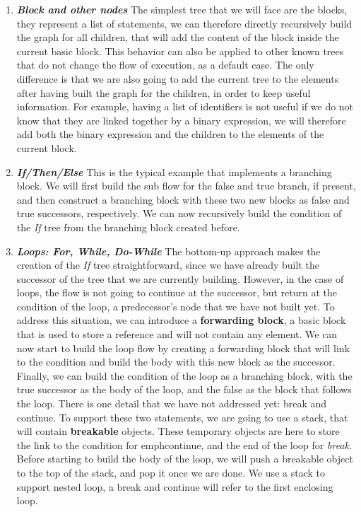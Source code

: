 \begin{enumerate}
	\item \textbf{\textit{Block and other nodes}} \newline 
	\label{subsubsec:block_and_others}
	The simplest tree that we will face are the blocks, they represent a list of statements, we can therefore directly recursively build the graph for all children, that will add the content of the block inside the current basic block. 
	This behavior can also be applied to other known trees that do not change the flow of execution, as a default case.
	The only difference is that we are also going to add the current tree to the elements after having built the graph for the children, in order to keep useful information. 
	For example, having a list of identifiers is not useful if we do not know that they are linked together by a binary expression, we will therefore add both the binary expression and the children to the elements of the current block.
	
	\item \textbf{\textit{If/Then/Else}} \newline 
	\label{subsubsec:if_then_else}
	This is the typical example that implements a branching block. 
	We will first build the sub flow for the false and true branch, if present, and then construct a branching block with these two new blocks as false and true successors, respectively.
	We can now recursively build the condition of the \emph{If} tree from the branching block created before.
	
	\item \textbf{\textit{Loops: For, While, Do-While}} \newline 
	\label{subsubsec:loops_cfg}
	The bottom-up approach makes the creation of the \emph{If} tree straightforward, since we have already built the successor of the tree that we are currently building. 
	However, in the case of loops, the flow is not going to continue at the successor, but return at the condition of the loop, a predecessor’s node that we have not built yet. 
	To address this situation, we can introduce a \textbf{forwarding block}, a basic block that is used to store a reference and will not contain any element.
	We can now start to build the loop flow by creating a forwarding block that will link to the condition and build the body with this new block as the successor. 
	Finally, we can build the condition of the loop as a branching block, with the true successor as the body of the loop, and the false as the block that follows the loop.
	There is one detail that we have not addressed yet: break and continue.
	To support these two statements, we are going to use a stack, that will contain \textbf{breakable} objects. 
	These temporary objects are here to store the link to the condition for emph{continue}, and the end of the loop for \emph{break}.
	Before starting to build the body of the loop, we will push a breakable object to the top of the stack, and pop it once we are done. 
	We use a stack to support nested loop, a break and continue will refer to the first enclosing loop.
	

\end{enumerate}
